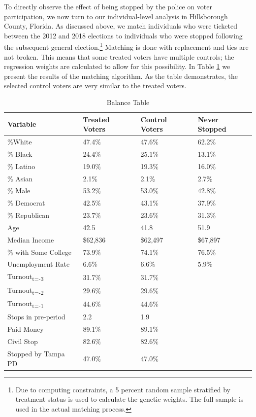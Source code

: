 \documentclass[
  12pt,
]{article}
\begin{document}
To directly observe the effect of being stopped by the police on voter participation, we now turn to our individual-level analysis in Hillsborough County, Florida. As discussed above, we match individuals who were ticketed between the 2012 and 2018 elections to individuals who were stopped following the subsequent general election.\footnote{Due to computing constraints, a 5 percent random sample stratified by treatment status is used to calculate the genetic weights. The full sample is used in the actual matching process.} Matching is done with replacement and ties are not broken. This means that some treated voters have multiple controls; the regression weights are calculated to allow for this possibility. In Table \ref{tab:balance} we present the results of the matching algorithm. As the table demonstrates, the selected control voters are very similar to the treated voters.

\begin{singlespace}
\begin{table}[!h]

\caption{\label{tab:baltab-chunk}\label{tab:balance} Balance Table}
\centering
\begin{tabular}[t]{llll}
\toprule
Variable & Treated Voters & Control Voters & Never Stopped\\
\midrule
\%White & 47.4\% & 47.6\% & 62.2\%\\
\% Black & 24.4\% & 25.1\% & 13.1\%\\
\% Latino & 19.0\% & 19.3\% & 16.0\%\\
\% Asian & 2.1\% & 2.1\% & 2.7\%\\
\% Male & 53.2\% & 53.0\% & 42.8\%\\
\% Democrat & 42.5\% & 43.1\% & 37.9\%\\
\% Republican & 23.7\% & 23.6\% & 31.3\%\\
Age & 42.5 & 41.8 & 51.9\\
Median Income & \$62,836 & \$62,497 & \$67,897\\
\% with Some College & 73.9\% & 74.1\% & 76.5\%\\
Unemployment Rate & 6.6\% & 6.6\% & 5.9\%\\
Turnout\textsubscript{t=-3} & 31.7\% & 31.7\% & \\
Turnout\textsubscript{t=-2} & 29.6\% & 29.6\% & \\
Turnout\textsubscript{t=-1} & 44.6\% & 44.6\% & \\
Stops in pre-period & 2.2 & 1.9 & \\
Paid Money & 89.1\% & 89.1\% & \\
Civil Stop & 82.6\% & 82.6\% & \\
Stopped by Tampa PD & 47.0\% & 47.0\% & \\
\bottomrule
\end{tabular}
\end{table}
\end{singlespace}
\end{document}
